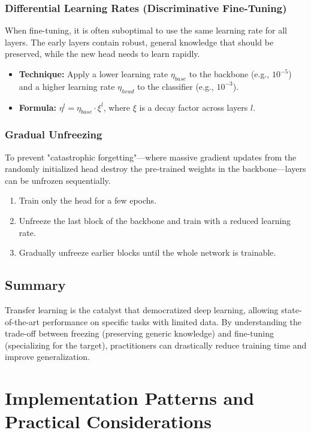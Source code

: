 \documentclass[12pt,a4paper]{report}
\begin{document}
\subsubsection{Differential Learning Rates (Discriminative Fine-Tuning)}
When fine-tuning, it is often suboptimal to use the same learning rate for all layers. The early layers contain robust, general knowledge that should be preserved, while the new head needs to learn rapidly.
\begin{itemize}
    \item \textbf{Technique:} Apply a lower learning rate $\eta_{base}$ to the backbone (e.g., $10^{-5}$) and a higher learning rate $\eta_{head}$ to the classifier (e.g., $10^{-3}$).
    \item \textbf{Formula:} $\eta^l = \eta_{base} \cdot \xi^l$, where $\xi$ is a decay factor across layers $l$.
\end{itemize}

\subsubsection{Gradual Unfreezing}
To prevent "catastrophic forgetting"—where massive gradient updates from the randomly initialized head destroy the pre-trained weights in the backbone—layers can be unfrozen sequentially.
\begin{enumerate}
    \item Train only the head for a few epochs.
    \item Unfreeze the last block of the backbone and train with a reduced learning rate.
    \item Gradually unfreeze earlier blocks until the whole network is trainable.
\end{enumerate}

\subsection{Summary}
Transfer learning is the catalyst that democratized deep learning, allowing state-of-the-art performance on specific tasks with limited data. By understanding the trade-off between freezing (preserving generic knowledge) and fine-tuning (specializing for the target), practitioners can drastically reduce training time and improve generalization.

\section{Implementation Patterns and Practical Considerations}
\end{document}
